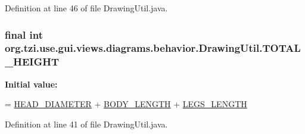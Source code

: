 Definition at line 46 of file Drawing\-Util.\-java.

\hypertarget{classorg_1_1tzi_1_1use_1_1gui_1_1views_1_1diagrams_1_1behavior_1_1_drawing_util_aa90dd6884fc5da3ab4f3660fa08b9c3b}{
\subsubsection[{T\-O\-T\-A\-L\-\_\-\-H\-E\-I\-G\-H\-T}]{\setlength{\rightskip}{0pt plus 5cm}final int org.\-tzi.\-use.\-gui.\-views.\-diagrams.\-behavior.\-Drawing\-Util.\-T\-O\-T\-A\-L\-\_\-\-H\-E\-I\-G\-H\-T\hspace{0.3cm}{\ttfamily [static]}}}\label{classorg_1_1tzi_1_1use_1_1gui_1_1views_1_1diagrams_1_1behavior_1_1_drawing_util_aa90dd6884fc5da3ab4f3660fa08b9c3b}
{\bfseries Initial value\-:}
\begin{DoxyCode}
= \hyperlink{classorg_1_1tzi_1_1use_1_1gui_1_1views_1_1diagrams_1_1behavior_1_1_drawing_util_afe28aef2f62f28414e744d463840ea34}{HEAD\_DIAMETER} + \hyperlink{classorg_1_1tzi_1_1use_1_1gui_1_1views_1_1diagrams_1_1behavior_1_1_drawing_util_a54babfc34a291b15ff66c65af83c4717}{BODY\_LENGTH}
            + \hyperlink{classorg_1_1tzi_1_1use_1_1gui_1_1views_1_1diagrams_1_1behavior_1_1_drawing_util_a4bd49379195ecd847e66b9a996a29cc9}{LEGS\_LENGTH}
\end{DoxyCode}


Definition at line 41 of file Drawing\-Util.\-java.

